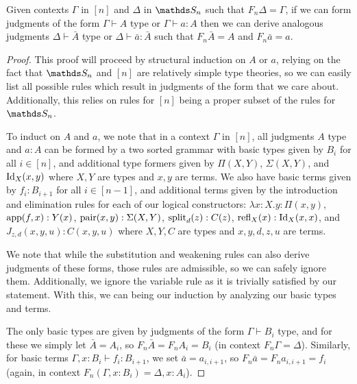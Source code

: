 \documentclass{article}
\begin{document}
\begin{prop}\label{prop:liftJ}
    Given contexts $\Gamma$ in $[n]$ and $\Delta$ in $\bS_n$ such that $F_n\Delta=\Gamma$, if we can form judgments of the form $\Gamma\vdash A$ type or $\Gamma\vdash a:A$ then we can derive analogous judgments $\Delta\vdash\bar{A}$ type or $\Delta\vdash\bar{a}:\bar{A}$ such that $F_n\bar{A}=A$ and $F_n\bar{a}=a$.
\end{prop}
\begin{proof}
    This proof will proceed by structural induction on $A$ or $a$, relying on the fact that $\bS_n$ and $[n]$ are relatively simple type theories, so we can easily list all possible rules which result in judgments of the form that we care about. Additionally, this relies on rules for $[n]$ being a proper subset of the rules for $\bS_n$.

    To induct on $A$ and $a$, we note that in a context $\Gamma$ in $[n]$, all judgments $A$ type and $a:A$ can be formed by a two sorted grammar with basic types given by $B_i$ for all $i\in[n]$, and additional type formers given by $\Pi(X,Y)$, $\Sigma(X,Y)$, and $\operatorname{Id}_X(x,y)$ where $X,Y$ are types and $x,y$ are terms. We also have basic terms given by $f_i:B_{i+1}$ for all $i\in[n-1]$, and additional terms given by the introduction and elimination rules for each of our logical constructors: $\lambda x:X.y:\Pi(x,y)$, $\operatorname{app}(f,x):Y(x)$, $\operatorname{pair}(x,y):\Sigma(X,Y)$, $\operatorname{split}_d(z):C(z)$, $\operatorname{refl}_X(x):\operatorname{Id}_X(x,x)$, and $J_{z,d}(x,y,u):C(x,y,u)$ where $X,Y,C$ are types and $x,y,d,z,u$ are terms.

    We note that while the substitution and weakening rules can also derive judgments of these forms, those rules are admissible, so we can safely ignore them. Additionally, we ignore the variable rule as it is trivially satisfied by our statement. With this, we can being our induction by analyzing our basic types and terms.

    The only basic types are given by judgments of the form $\Gamma\vdash B_i$ type, and for these we simply let $\bar{A}=A_i$, so $F_n\bar{A}=F_nA_i=B_i$ (in context $F_n\Gamma=\Delta$). Similarly, for basic terms $\Gamma,x:B_i\vdash f_i:B_{i+1}$, we set $\bar{a}=a_{i,i+1}$, so $F_n\bar{a}=F_na_{i,i+1}=f_i$ (again, in context $F_n(\Gamma,x:B_i)=\Delta,x:A_i$).


\end{proof}
\end{document}

